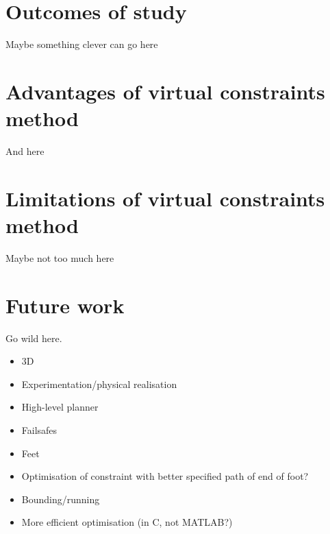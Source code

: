 \section{Outcomes of study}
Maybe something clever can go here

\section{Advantages of virtual constraints method}
And here

\section{Limitations of virtual constraints method}
Maybe not too much here

\section{Future work}
Go wild here.

\begin{itemize}
	\item 3D
	\item Experimentation/physical realisation
	\item High-level planner
	\item Failsafes
	\item Feet
	\item Optimisation of constraint with better specified path of end of foot?
	\item Bounding/running
	\item More efficient optimisation (in C, not MATLAB?)
\end{itemize}